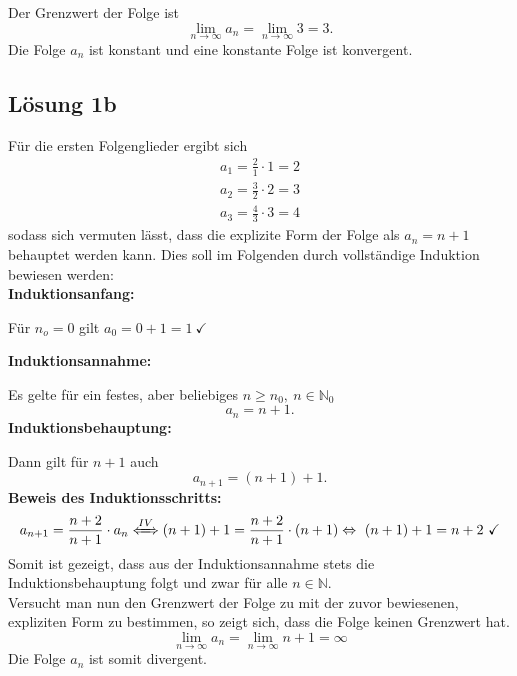 Der Grenzwert der Folge ist
\begin{equation*}
\lim _{n\rightarrow \infty } a_{n} =\lim _{n\rightarrow \infty } 3=3\text{.}
\end{equation*}
Die Folge $\displaystyle a_{n}$ ist konstant und eine konstante Folge ist konvergent.



\subsection{Lösung 1b}

Für die ersten Folgenglieder ergibt sich
\begin{gather*}
a_{1} =\frac{2}{1} \cdot 1=2\\
a_{2} =\frac{3}{2} \cdot 2=3\\
a_{3} =\frac{4}{3} \cdot 3=4
\end{gather*}
sodass sich vermuten lässt, dass die explizite Form der Folge als $\displaystyle a_{n} =n+1$ behauptet werden kann. Dies soll im Folgenden durch vollständige Induktion bewiesen werden: \\

\textbf{Induktionsanfang: }

Für $\displaystyle n_{o} =0$ gilt $\displaystyle a_{0} =0+1=1\ \checkmark $

\textbf{Induktionsannahme:}

Es gelte für ein festes, aber beliebiges $\displaystyle n\geq n_{0} ,\ n\in \mathbb{N}_{0}$
\begin{equation*}
a_{n} =n+1\text{.}
\end{equation*}
\textbf{Induktionsbehauptung:}

Dann gilt für $\displaystyle n+1$ auch
\begin{equation*}
a_{n+1} =( n+1) +1\text{.}
\end{equation*}
\textbf{Beweis des Induktionsschritts:}
\begin{equation*}
a_{n+1} =\frac{n+2}{n+1} \cdot a_{n}\xLeftrightarrow{IV}( n+1) +1=\frac{n+2}{n+1} \cdot ( n+1) \Leftrightarrow \ ( n+1) +1=n+2\ \checkmark 
\end{equation*}
Somit ist gezeigt, dass aus der Induktionsannahme stets die Induktionsbehauptung folgt und zwar für alle $\displaystyle n\in \mathbb{N}$.\\

Versucht man nun den Grenzwert der Folge zu mit der zuvor bewiesenen, expliziten Form zu bestimmen, so zeigt sich, dass die Folge keinen Grenzwert hat.
\begin{equation*}
\lim _{n\rightarrow \infty } a_{n} =\lim _{n\rightarrow \infty } n+1=\infty 
\end{equation*}
Die Folge $\displaystyle a_{n}$ ist somit divergent.